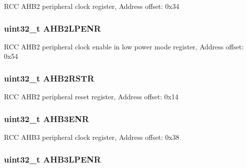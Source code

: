 R\-C\-C A\-H\-B2 peripheral clock register, Address offset\-: 0x34 \hypertarget{struct_r_c_c___type_def_a2b30982547fae7d545d260312771b5c9}{
\subsubsection[{A\-H\-B2\-L\-P\-E\-N\-R}]{ uint32\-\_\-t A\-H\-B2\-L\-P\-E\-N\-R}}\label{struct_r_c_c___type_def_a2b30982547fae7d545d260312771b5c9}
R\-C\-C A\-H\-B2 peripheral clock enable in low power mode register, Address offset\-: 0x54 \hypertarget{struct_r_c_c___type_def_a78a5aa9dd5694c48a7d8e66888a46450}{
\subsubsection[{A\-H\-B2\-R\-S\-T\-R}]{ uint32\-\_\-t A\-H\-B2\-R\-S\-T\-R}}\label{struct_r_c_c___type_def_a78a5aa9dd5694c48a7d8e66888a46450}
R\-C\-C A\-H\-B2 peripheral reset register, Address offset\-: 0x14 \hypertarget{struct_r_c_c___type_def_acdaa650fcd63730825479f6e8f70d4c0}{
\subsubsection[{A\-H\-B3\-E\-N\-R}]{ uint32\-\_\-t A\-H\-B3\-E\-N\-R}}\label{struct_r_c_c___type_def_acdaa650fcd63730825479f6e8f70d4c0}
R\-C\-C A\-H\-B3 peripheral clock register, Address offset\-: 0x38 \hypertarget{struct_r_c_c___type_def_a2ff82b9bf0231645108965aa0febd766}{
\subsubsection[{A\-H\-B3\-L\-P\-E\-N\-R}]{ uint32\-\_\-t A\-H\-B3\-L\-P\-E\-N\-R}}\label{struct_r_c_c___type_def_a2ff82b9bf0231645108965aa0febd766}
